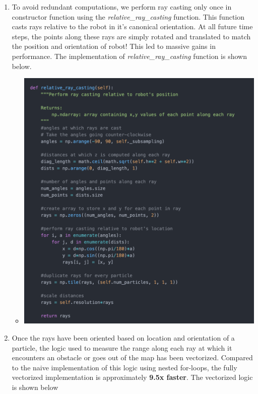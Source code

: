 \documentclass[12pt, a4paper]{article}
\begin{document}
\begin{enumerate}
  \item To avoid redundant computations, we perform ray casting only once in constructor function using the \textit{relative\_ray\_casting} function. This function casts rays relative to the robot in it's canonical orientation. At all future time steps, the points along these rays are simply rotated and translated to match the position and orientation of robot! This led to massive gains in performance. The implementation of \textit{relative\_ray\_casting} function is shown below.
  \begin{itemize}
    \item 
    \begin{minipage}[t]{\linewidth}
      \vspace{0pt}
      \begin{center}
        \includegraphics[scale=0.25]{./results/ray_casting_opt_1.png}
        \label{fig:sm_1}
      \end{center}
    \end{minipage}
  \end{itemize}
  \item Once the rays have been oriented based on location and orientation of a particle, the logic used to measure the range along each ray at which it encounters an obstacle or goes out of the map has been vectorized. Compared to the naive implementation of this logic using nested for-loops, the fully vectorized implementation is approximately \textbf{9.5x faster}.  The vectorized logic is shown below

\end{enumerate}
\end{document}
